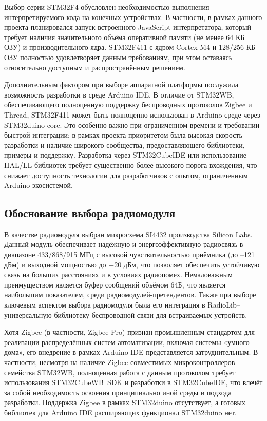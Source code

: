 \documentclass[14pt, a4paper]{extreport}
\begin{document}
Выбор серии STM32F4 обусловлен необходимостью выполнения интерпретируемого кода на конечных устройствах. В частности, в рамках данного проекта планировался запуск встроенного
JavaScript-интерпретатора, который требует наличия значительного объёма оперативной памяти (не менее 64 КБ ОЗУ) и производительного ядра. STM32F411 с ядром Cortex-M4 и 128/256 КБ
ОЗУ полностью удовлетворяет данным требованиям, при этом оставаясь относительно доступным и распространённым решением.

Дополнительным фактором при выборе аппаратной платформы послужила возможность разработки в среде Arduino IDE. В отличие от STM32WB, обеспечивающего полноценную поддержку беспроводных
протоколов Zigbee и Thread, STM32F411 может быть полноценно использован в Arduino-среде через STM32duino core. Это особенно важно при ограниченном времени и требовании быстрой интеграции:
в рамках проекта приоритетом была высокая скорость разработки и наличие широкого сообщества, предоставляющего библиотеки, примеры и поддержку. Разработка через
STM32CubeIDE или использование HAL/LL библиотек требует существенно более высокого порога вхождения, что снижает доступность технологии для разработчиков с опытом, ограниченным
Arduino-экосистемой.

\subsection{Обоснование выбора радиомодуля}

В качестве радиомодуля выбран микросхема SI4432 производства Silicon Labs. Данный модуль обеспечивает надёжную и энергоэффективную радиосвязь в диапазоне 433/868/915 МГц с высокой
чувствительностью приёмника (до –121 дБм) и выходной мощностью до +20 дБм, что позволяет обеспечить устойчивую связь на больших расстояниях и в условиях радиопомех. Немаловажным
преимуществом является буфер сообщений объёмом 64Б, что является наибольшим показателем, среди радиомодулей-претендентов. Также при выборе ключевым аспектом выбора радиомодуля
была его интеграция в RadioLib--универсальную библиотеку беспроводной связи для встраиваемых устройств.

Хотя Zigbee (в частности, Zigbee Pro) признан промышленным стандартом для реализации распределённых систем автоматизации, включая системы «умного дома», его внедрение в рамках Arduino
IDE представляется затруднительным. В частности, несмотря на наличие Zigbee-совместимых микроконтроллеров семейства STM32WB, полноценная работа с данным протоколом требует
использования STM32CubeWB~SDK и разработки в STM32CubeIDE, что влечёт за собой необходимость освоения принципиально иной среды и подхода разработки. Поддержка Zigbee в
рамках STM32duino отсутствует, а готовых библиотек для Arduino IDE расширяющих функционал STM32duino нет.
\end{document}
